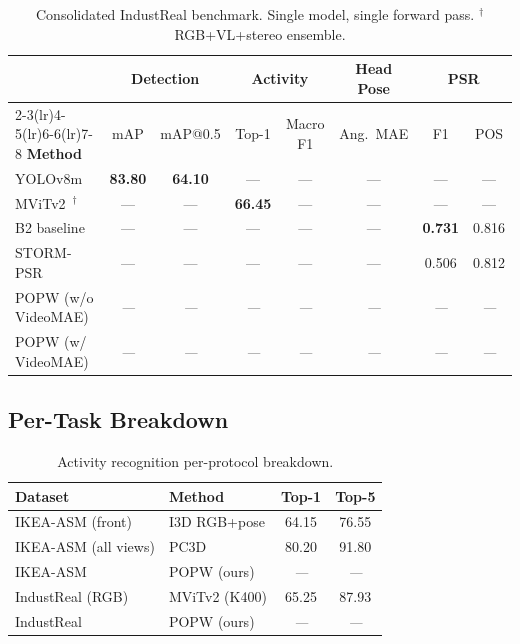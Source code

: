 \documentclass[10pt,journal,compsoc]{IEEEtran}
\newcommand{\popw}{POPW}
\newcommand{\ikea}{IKEA-ASM}
\newcommand{\industreal}{IndustReal}
\newcommand{\todo}{\textit{---}}
\newcommand{\best}[1]{\textbf{#1}}
\newcommand{\popwres}{\todo}
\begin{document}
\begin{table}[htbp]
\centering
\small
\caption{Consolidated IndustReal benchmark. Single model, single forward pass. $^\dagger$RGB+VL+stereo ensemble.}
\label{tab:main-results}
\begin{tabular}{l c c c c c c c}
\toprule
 & \multicolumn{2}{c}{\textbf{Detection}} & \multicolumn{2}{c}{\textbf{Activity}} & \textbf{Head Pose} & \multicolumn{2}{c}{\textbf{PSR}} \\
\cmidrule(lr){2-3}\cmidrule(lr){4-5}\cmidrule(lr){6-6}\cmidrule(lr){7-8}
\textbf{Method} & mAP & mAP@0.5 & Top-1 & Macro F1 & Ang.\ MAE & F1 & POS \\
\midrule
YOLOv8m~\cite{schoonbeek2024industreal} & \best{83.80} & \best{64.10} & --- & --- & --- & --- & --- \\
MViTv2~\cite{schoonbeek2024industreal}$^\dagger$ & --- & --- & \best{66.45} & --- & --- & --- & --- \\
B2 baseline~\cite{schoonbeek2024industreal} & --- & --- & --- & --- & --- & \best{0.731} & 0.816 \\
STORM-PSR~\cite{schoonbeek2025storm} & --- & --- & --- & --- & --- & 0.506 & 0.812 \\
\midrule
\popw{} (w/o VideoMAE) & \popwres & \popwres & \popwres & \popwres & \popwres & \popwres & \popwres \\
\popw{} (w/ VideoMAE) & \popwres & \popwres & \popwres & \popwres & \popwres & \popwres & \popwres \\
\bottomrule
\end{tabular}
\end{table}

\subsection{Per-Task Breakdown}

\begin{table}[htbp]
\centering
\small
\caption{Activity recognition per-protocol breakdown.}
\label{tab:activity-breakdown}
\begin{tabular}{l l c c}
\toprule
\textbf{Dataset} & \textbf{Method} & \textbf{Top-1} & \textbf{Top-5} \\
\midrule
\ikea{} (front) & I3D RGB+pose & 64.15 & 76.55 \\
\ikea{} (all views) & PC3D & 80.20 & 91.80 \\
\ikea{} & \popw{} (ours) & \popwres & \popwres \\
\midrule
\industreal{} (RGB) & MViTv2 (K400) & 65.25 & 87.93 \\
\industreal{} & \popw{} (ours) & \popwres & \popwres \\
\bottomrule
\end{tabular}
\end{table}
\end{document}
